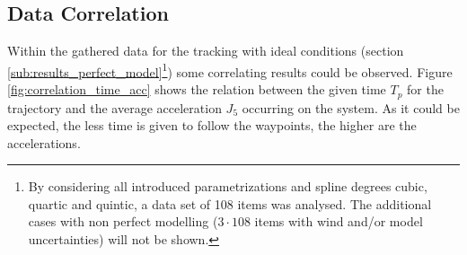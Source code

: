 \subsection{Data Correlation}
Within the gathered data for the tracking with ideal conditions (section \ref{sub:results_perfect_model}\footnote{By considering all introduced parametrizations and spline degrees cubic, quartic and quintic, a data set of 108 items was analysed. The additional cases  with non perfect modelling ($3\cdot 108$ items with wind and/or model uncertainties) will not be shown.}) some correlating results could be observed. Figure \ref{fig:correlation_time_acc} shows the relation between the given time $T_p$ for the trajectory and the average acceleration $J_5$ occurring on the system. As it could be expected, the less time is given to follow the waypoints, the higher are the accelerations.

